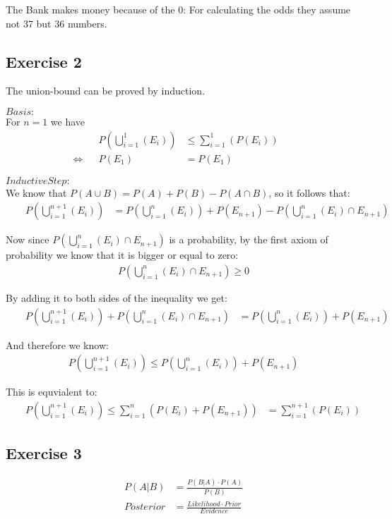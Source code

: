 \noindent {}

The Bank makes money because of the $0$: For calculating the odds they assume not 37 but 36 numbers.


\subsection*{Exercise 2}
The union-bound can be proved by induction.

\noindent $Basis:$ \\ For $n=1$ we have
\setcounter{equation}{0}
\begin{align}
& & P(\bigcup_{i=1}^{1}(E_i)) & \leq \sum_{i=1}^{1}(P(E_i)) & & \\
\Leftrightarrow & & P(E_1) & = P(E_1) & & 
\end{align}

\noindent $Inductive Step:$ \\
We know that $P(A \cup B) = P(A) + P(B) - P(A \cap B)$, so it follows that:
\begin{align}
& & P(\bigcup_{i=1}^{n+1}(E_i)) & = P(\bigcup_{i=1}^{n}(E_i)) + P(E_{n+1}) - P(\bigcup_{i=1}^{n}(E_i) \cap E_{n+1}) & &
\end{align}

\noindent Now since $P(\bigcup_{i=1}^{n}(E_i) \cap E_{n+1})$ is a probability, by the first axiom of probability we know that it is bigger or equal to zero:
\begin{align}
 P(\bigcup_{i=1}^{n}(E_i) \cap E_{n+1}) \geq 0 
\end{align}

\noindent By adding it to both sides of the inequality we get:
\begin{align}
& & P(\bigcup_{i=1}^{n+1}(E_i)) + P(\bigcup_{i=1}^{n}(E_i) \cap E_{n+1}) & = P(\bigcup_{i=1}^{n}(E_i)) + P(E_{n+1})  & &
\end{align}

\noindent And therefore we know:
\begin{align}
& & P(\bigcup_{i=1}^{n+1}(E_i)) \leq P(\bigcup_{i=1}^{n}(E_i)) + P(E_{n+1})  & &
\end{align}

\noindent This is equvialent to:
\begin{align}
& & P(\bigcup_{i=1}^{n+1}(E_i)) \leq \sum_{i=1}^{n}(P(E_i) + P(E_{n+1})) & = \sum_{i=1}^{n+1}(P(E_i)) & &
\end{align}
\setcounter{equation}{0}


\subsection*{Exercise 3}
\begin{align*}
P(A|B) & = \frac{P(B|A) \cdot P(A)}{P(B)} \\
Posterior & = \frac{Likelihood \cdot Prior}{Evidence}
\end{align*}

